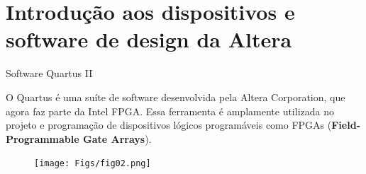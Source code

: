 \documentclass{CPSPresentation}
\begin{document}
\section{Introdução aos dispositivos e software de design da Altera}


\begin{frame}{Software Quartus II}
	
\begin{block}{}
	\justifying
	O Quartus é uma suíte de software desenvolvida pela Altera Corporation, que agora faz parte da Intel FPGA. Essa ferramenta é amplamente utilizada no projeto e programação de dispositivos lógicos programáveis como FPGAs (\textbf{Field-Programmable Gate Arrays}).
	
\end{block}	
	
	
	\begin{figure}[h]
		\centering
		\texttt{[image: Figs/fig02.png]}
	\end{figure}
	
\end{frame}
\end{document}
